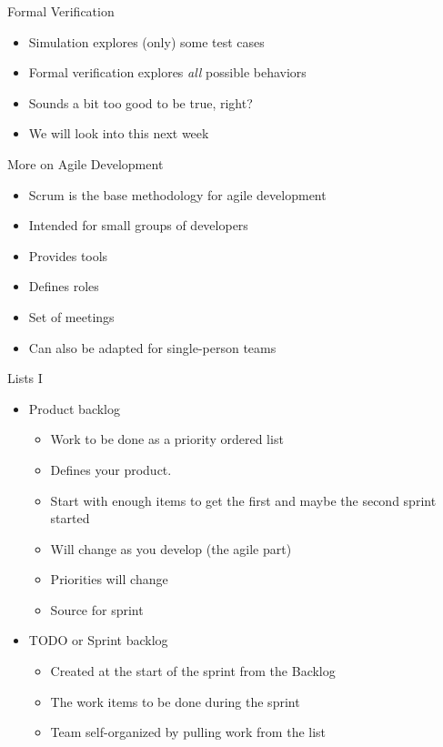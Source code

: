 \begin{frame}[fragile]{Formal Verification}
\begin{itemize}
\item Simulation explores (only) some test cases
\item Formal verification explores \emph{all} possible behaviors
\item Sounds a bit too good to be true, right?
\item We will look into this next week
\end{itemize}
\end{frame}


\begin{frame}[fragile]{More on Agile Development}
\begin{itemize}
\item Scrum is the base methodology for agile development
\item Intended for small groups of developers
\item Provides tools
\item Defines roles
\item Set of meetings
\item Can also be adapted for single-person teams
\end{itemize}
\end{frame}

\begin{frame}[fragile]{Lists I}
\begin{itemize}
\item Product backlog
\begin{itemize}
\item Work to be done as a priority ordered list
\item Defines your product.
\item Start with enough items to get the first and maybe the second sprint started
\item Will change as you develop (the agile part)
\item Priorities will change
\item Source for sprint
\end{itemize}
\item TODO or Sprint backlog
\begin{itemize}
\item Created at the start of the sprint from the Backlog
\item The work  items to be done during the sprint
\item Team self-organized by pulling work from the list
\end{itemize}
\end{itemize}
\end{frame}

